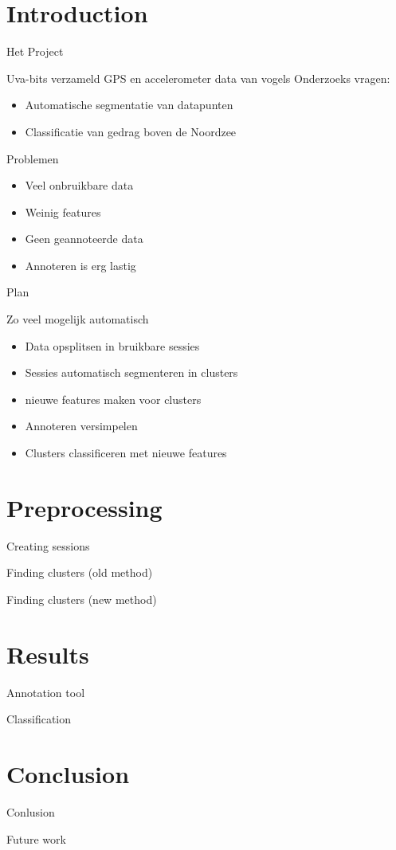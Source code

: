 \documentclass{beamer}
\title{\projectName}
\subtitle{\projectAbbreviation}
\author{Jesse Eisses, Sosha Happel, Maarten Inja and Maarten de Waard}
\institute{UvA}
\newcommand{\slide}[2]
{
\begin{frame}
\begin{block}{#1} 

#2

\end{block} \end{frame}
}
\begin{document}
\begin{frame}
\titlepage
\end{frame}



\section{Introduction}
\slide{Het Project}
{
Uva-bits verzameld GPS en accelerometer data van vogels
Onderzoeks vragen:
\begin{itemize}
	\item Automatische segmentatie van datapunten
	\item Classificatie van gedrag boven de Noordzee
\end{itemize} 
}

\slide{Problemen}
{
\begin{itemize}
	\item Veel onbruikbare data
	\item Weinig features
	\item Geen geannoteerde data
	\item Annoteren is erg lastig
\end{itemize} 
}

\slide{Plan}
{
Zo veel mogelijk automatisch
\begin{itemize}
	\item Data opsplitsen in bruikbare sessies
	\item Sessies automatisch segmenteren in clusters
	\item nieuwe features maken voor clusters
	\item Annoteren versimpelen
	\item Clusters classificeren met nieuwe features
\end{itemize} 
}

\section{Preprocessing}
\slide{Creating sessions}
{
    
}

\slide{Finding clusters (old method)}
{
    
}

\slide{Finding clusters (new method)}
{
    
}



\section{Results}
\slide{Annotation tool}
{
	
}

\slide{Classification}
{
	
}

\section{Conclusion}

\slide{Conlusion}
{
	
}

\slide{Future work}
{
	
}
\end{document}
